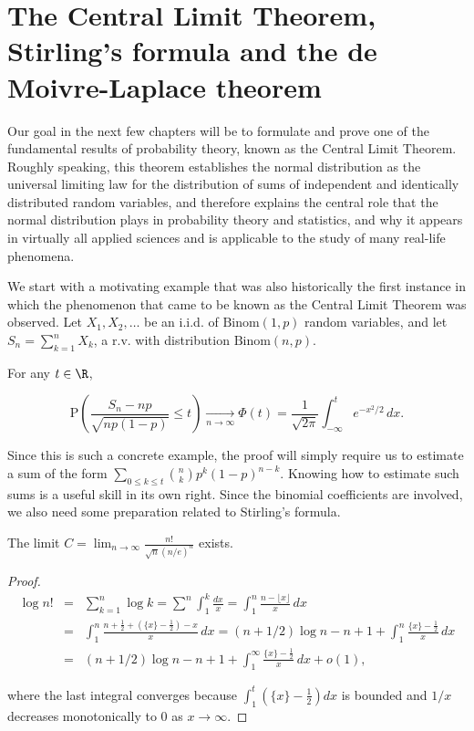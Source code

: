 \chapter{The Central Limit Theorem, Stirling’s formula and the de Moivre-Laplace theorem}

Our goal in the next few chapters will be to
formulate and prove one of the fundamental results of
probability theory, known as the Central Limit
Theorem. Roughly speaking, this theorem establishes
the normal distribution as the universal limiting law
for the distribution of sums of independent and
identically distributed random variables, and
therefore explains the central role that the normal
distribution plays in probability theory and
statistics, and why it appears in virtually all
applied sciences and is applicable to the study of
many real-life phenomena.

We start with a motivating example that was also
historically the first instance in which the
phenomenon that came to be known as the Central Limit
Theorem was observed. Let $X_1, X_2, \ldots$ be an
i.i.d. of $\textrm{Binom}(1,p)$ random variables, and
let $S_n = \sum_{k=1}^n X_k$, a r.v. with
distribution $\textrm{Binom}(n,p)$.

\begin{thm}
\label{thm-demoivre-laplace}
For any $t\in \R$,

\[
\mathrm{P}
\left(\frac{S_n - n p}{\sqrt{n p(1-p)}} \le t \right) \xrightarrow[n\to\infty]{} \Phi(t) = \frac{1}{\sqrt{2\pi}}
\int_{-\infty}^t e^{-x^2/2}\,dx.
\]

\end{thm}

\noindent Since this is such a concrete example, the proof will
simply require us to estimate a sum of the form
$\sum_{0\le k\le t} \binom{n}{k} p^k (1-p)^{n-k}$.
Knowing how to estimate such sums is a useful skill in
its own right. Since the binomial coefficients are
involved, we also need some preparation related to
Stirling's formula.

\begin{lem}
\label{lem-prestirling}
The limit
$C = \lim_{n\to\infty} \frac{n!}{\sqrt{n} (n/e)^n}$
exists.
\end{lem}

\begin{proof}

\begin{eqnarray*}
\log n! &=& \sum_{k=1}^n \log k = \sum_{}^n \int_1^k \frac{dx}{x} = \int_1^n \frac{n-\lfloor x\rfloor}{x}\,dx \\
&=& \int_1^n \frac{n+\frac12 + (\{ x\}-\frac12)-x}{x}\, dx = (n+1/2)\log n - n + 1 + \int_1^n \frac{\{x\}-\frac12}{x}\,dx \\
&=& (n+1/2)\log n - n + 1 + \int_1^\infty \frac{\{x\}-\frac12}{x}\,dx + o(1),
\end{eqnarray*}

\noindent where the last integral converges because
$\int_1^t (\{x\}-\frac12) dx$ is bounded and $1/x$
decreases monotonically to 0 as $x\to\infty$.
\end{proof}

